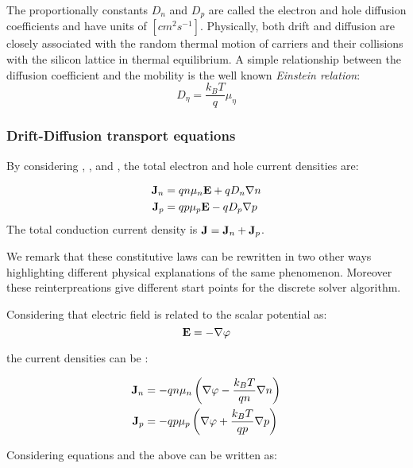 The proportionally constants $D_n$ and $D_p$ are called the electron and hole diffusion coefficients and have units of $[cm^2s^{-1}]$. Physically, both drift and diffusion are closely associated with the random thermal motion of carriers and their collisions with the silicon lattice in thermal equilibrium. A simple relationship between the diffusion coefficient and the mobility is the well known \textit{Einstein relation}:
\begin{equation}
D_\eta = \dfrac{k_BT}{q}\mu_\eta
\end{equation}

\subsubsection{Drift-Diffusion transport equations}
\label{subsub:driftdiffusion transport}

By considering , ,  and , the total electron and hole current densities are:

\begin{align}
\mathbf{J}_n &= qn\mu_n\mathbf{E} + qD_n\nabla n  \label{eq: drift diff electron}\\ 
\mathbf{J}_p &= qp\mu_p\mathbf{E} - qD_p \nabla p \label{eq: drift diff hole}
\end{align}
The total conduction current density is $\mathbf{J}=\mathbf{J}_n+\mathbf{J}_p$.

We remark that these constitutive laws can be rewritten in two other ways highlighting different physical explanations of the same phenomenon. Moreover these reinterpreations  give different start points for the discrete solver algorithm.

Considering that electric field is related to the scalar potential as:
\begin{equation}
\label{eq: relazione pot electric}
\mathbf{E}  = -\nabla \varphi
\end{equation}

the current densities can be :

\begin{align*}
\mathbf{J}_n &= -qn\mu_n\left(\nabla \varphi - \dfrac{k_BT}{qn}\nabla n \right)\\ 
\mathbf{J}_p &= -qp\mu_p\left(\nabla \varphi+ \dfrac{k_BT}{qp} \nabla p \right)
\end{align*}

Considering equations  and  the above can be written as:

